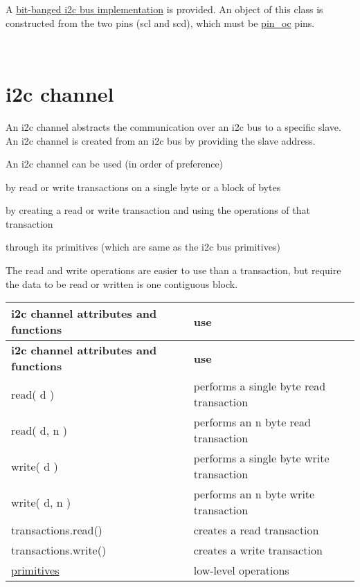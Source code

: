 A \hyperlink{classhwlib_1_1i2c__bus__bit__banged__scl__sda}{bit-\/banged i2c bus implementation} is provided. An object of this class is constructed from the two pins (scl and scd), which must be \hyperlink{classhwlib_1_1pin__oc}{pin\+\_\+oc} pins.

~\newline
 

\hypertarget{i2c_i2c-channel}{}\section{i2c channel}\label{i2c_i2c-channel}
An i2c channel abstracts the communication over an i2c bus to a specific slave. An i2c channel is created from an i2c bus by providing the slave address.

An i2c channel can be used (in order of preference)
\begin{DoxyItemize}
\item by read or write transactions on a single byte or a block of bytes
\item by creating a read or write transaction and using the operations of that transaction
\item through its primitives (which are same as the i2c bus primitives)
\end{DoxyItemize}

The read and write operations are easier to use than a transaction, but require the data to be read or written is one contiguous block.

\tabulinesep=1mm
\begin{longtabu} spread 0pt [c]{*{2}{|X[-1]}|}
\hline
\rowcolor{\tableheadbgcolor}\textbf{ i2c channel attributes and functions }&\textbf{ use  }\\
\endfirsthead
\hline
\endfoot
\hline
\rowcolor{\tableheadbgcolor}\textbf{ i2c channel attributes and functions }&\textbf{ use  }\\
\endhead
read( d ) &performs a single byte read transaction \\
read( d, n ) &performs an n byte read transaction \\
write( d ) &performs a single byte write transaction \\
write( d, n ) &performs an n byte write transaction \\
transactions.read() &creates a read transaction \\
transactions.write() &creates a write transaction \\
\hyperlink{classhwlib_1_1i2c__primitives}{primitives} &low-\/level operations \\
\end{longtabu}



